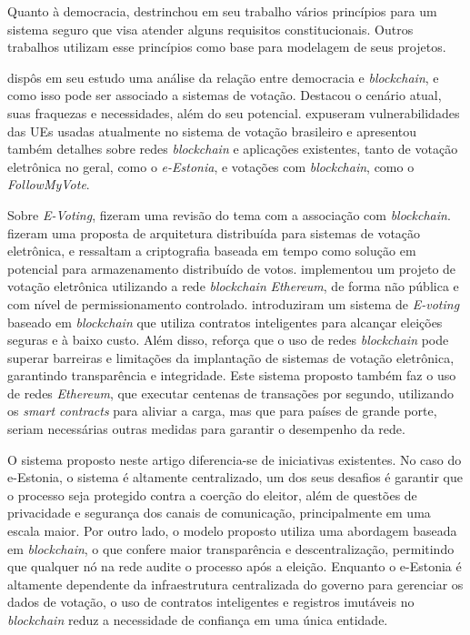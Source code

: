 \documentclass[portuguese]{textolivre}
\begin{document}
	Quanto à democracia, \textcite{gritzalis2002principles} destrinchou em seu trabalho vários princípios para um sistema seguro que visa atender alguns requisitos constitucionais. Outros trabalhos utilizam esse princípios como base para modelagem de seus projetos.
	
	\textcite{fornasier2022democracia} dispôs em seu estudo uma análise da relação entre democracia e \emph{blockchain}, e como isso pode ser associado a sistemas de votação. Destacou o cenário atual, suas fraquezas e necessidades, além do seu potencial. \textcite{sepulvida2019estudo} expuseram vulnerabilidades das UEs usadas atualmente no sistema de votação brasileiro e apresentou também detalhes sobre redes \emph{blockchain} e aplicações existentes, tanto de votação eletrônica no geral, como o \emph{e-Estonia}, e votações com \emph{blockchain}, como o \emph{FollowMyVote}.
	
	Sobre \textit{E-Voting}, \textcite{gibson2016review, 10061373, electronics13010017} fizeram uma revisão do tema com a associação com \textit{blockchain}. \textcite{Soares_Vasconcelos_2023} fizeram  uma proposta de arquitetura distribuída para sistemas de votação eletrônica, e ressaltam a criptografia baseada em tempo como solução em potencial para armazenamento distribuído de votos. \textcite{lacerda2019estudo} implementou um projeto de votação eletrônica utilizando a rede \emph{blockchain} \emph{Ethereum}, de forma não pública e com nível de permissionamento controlado. \textcite{hjalmarsson2018blockchain} introduziram um sistema de \emph{E-voting} baseado em \emph{blockchain} que utiliza contratos inteligentes para alcançar eleições seguras e à baixo custo. Além disso, reforça que o uso de redes \emph{blockchain} pode superar barreiras e limitações da implantação de sistemas de votação eletrônica, garantindo transparência e integridade. Este sistema proposto também faz o uso de redes \emph{Ethereum}, que executar centenas de transações por segundo, utilizando os \emph{smart contracts} para aliviar a carga, mas que para países de grande porte, seriam necessárias outras medidas para garantir o desempenho da rede.
	
O sistema proposto neste artigo diferencia-se de iniciativas existentes. No caso do e-Estonia, o sistema é altamente centralizado, um dos seus desafios é garantir que o processo seja protegido contra a coerção do eleitor, além de questões de privacidade e segurança dos canais de comunicação, principalmente em uma escala maior. Por outro lado, o modelo proposto utiliza uma abordagem baseada em \emph{blockchain}, o que confere maior transparência e descentralização, permitindo que qualquer nó na rede audite o processo após a eleição. Enquanto o e-Estonia é altamente dependente da infraestrutura centralizada do governo para gerenciar os dados de votação, o uso de contratos inteligentes e registros imutáveis no \emph{blockchain} reduz a necessidade de confiança em uma única entidade.
	
\end{document}
